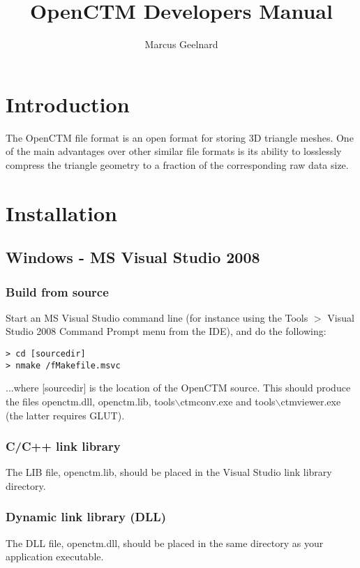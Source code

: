 

\author{Marcus Geelnard}
\title{OpenCTM Developers Manual}



\maketitle

\tableofcontents

\chapter{Introduction}
The OpenCTM file format is an open format for storing 3D triangle meshes.
One of the main advantages over other similar file formats is its ability
to losslessly compress the triangle geometry to a fraction of the corresponding
raw data size.

\chapter{Installation}

\section{Windows - MS Visual Studio 2008}
\subsection{Build from source}
Start an MS Visual Studio command line (for instance using the Tools $>$
Visual Studio 2008 Command Prompt menu from the IDE), and do the following:

\begin{lstlisting}
> cd [sourcedir]
> nmake /fMakefile.msvc
\end{lstlisting}

...where [sourcedir] is the location of the OpenCTM source. This should produce the
files openctm.dll, openctm.lib, tools$\backslash$ctmconv.exe and
tools$\backslash$ctmviewer.exe (the latter requires GLUT).

\subsection{C/C++ link library}
The LIB file, openctm.lib, should be placed in the Visual Studio link library
directory.

\subsection{Dynamic link library (DLL)}
The DLL file, openctm.dll, should be placed in the same directory as your application executable.


